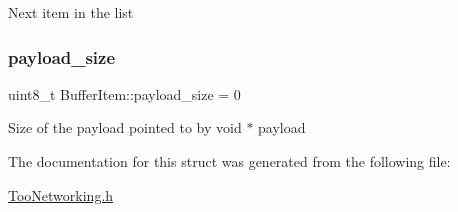 Next item in the list \mbox{\label{structBufferItem_a5c3187c383ceec1825964d5e512273de}} 
\subsubsection{\texorpdfstring{payload\+\_\+size}{payload\_size}}
{\footnotesize\ttfamily uint8\+\_\+t Buffer\+Item\+::payload\+\_\+size = 0}

Size of the payload pointed to by void $\ast$ payload 

The documentation for this struct was generated from the following file\+:\begin{DoxyCompactItemize}
\item 
\hyperlink{TooNetworking_8h}{Too\+Networking.\+h}\end{DoxyCompactItemize}
